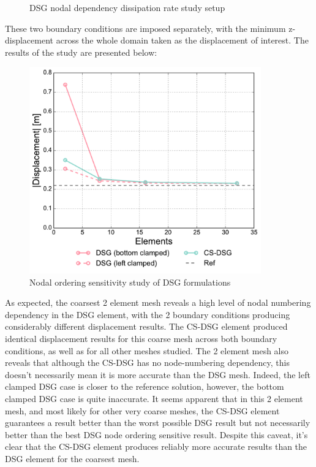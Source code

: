 \begin{figure}[H]
	\caption{\label{csdsg_nodal_dissipation}DSG nodal dependency dissipation rate study setup}
\end{figure}

These two boundary conditions are imposed separately, with the minimum z-displacement across the whole domain taken as the displacement of interest. The results of the study are presented below:

\begin{figure}[H]
	\centering
	\includegraphics[width=10cm]{images/node_ordering_study.pdf}
	\caption{Nodal ordering sensitivity study of DSG formulations}
	\label{fig:Nodal ordering sensitivity study}
\end{figure}

As expected, the coarsest 2 element mesh reveals a high level of nodal numbering dependency in the DSG element, with the 2 boundary conditions producing considerably different displacement results. The CS-DSG element produced identical displacement results for this coarse mesh across both boundary conditions, as well as for all other meshes studied. The 2 element mesh also reveals that although the CS-DSG has no node-numbering dependency, this doesn't necessarily mean it is more accurate than the DSG mesh. Indeed, the left clamped DSG case is closer to the reference solution, however, the bottom clamped DSG case is quite inaccurate. It seems apparent that in this 2 element mesh, and most likely for other very coarse meshes, the CS-DSG element guarantees a result better than the worst possible DSG result but not necessarily better than the best DSG node ordering sensitive result. Despite this caveat, it's clear that the CS-DSG element produces reliably more accurate results than the DSG element for the coarsest mesh.

